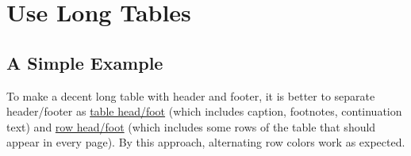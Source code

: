 \documentclass[oneside]{book}
\begin{document}
\chapter{Use Long Tables}
\label{chap:long}

\section{A Simple Example}

To make a decent long table with header and footer, it is better to separate header/footer as
\underline{table head/foot} (which includes caption, footnotes, continuation text)
and \underline{row head/foot} (which includes some rows of the table that should appear in every page).
By this approach, alternating row colors work as expected.

\end{document}
